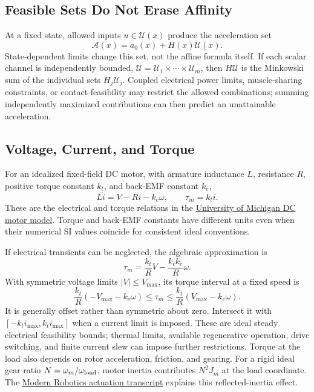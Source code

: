 \subsection{Feasible Sets Do Not Erase Affinity}

At a fixed state, allowed inputs $u\in\mathcal U(x)$ produce the acceleration set
\begin{equation}
\mathcal A(x)=a_0(x)+H(x)\mathcal U(x).
\end{equation}
State-dependent limits change this set, not the affine formula itself. If each scalar channel is independently bounded, $\mathcal U=\mathcal U_1\times\cdots\times\mathcal U_m$, then $H\mathcal U$ is the Minkowski sum of the individual sets $H_j\mathcal U_j$. Coupled electrical power limits, muscle-sharing constraints, or contact feasibility may restrict the allowed combinations; summing independently maximized contributions can then predict an unattainable acceleration.

\subsection{Voltage, Current, and Torque}

For an idealized fixed-field DC motor, with armature inductance $L$, resistance $R$, positive torque constant $k_t$, and back-EMF constant $k_e$,
\begin{equation}
L\dot i=V-Ri-k_e\omega,\qquad \tau_m=k_t i.
\end{equation}
These are the electrical and torque relations in the \href{https://ctms.engin.umich.edu/CTMS/?example=MotorSpeed&section=SystemModeling}{University of Michigan DC motor model}. Torque and back-EMF constants have different units even when their numerical SI values coincide for consistent ideal conventions.

If electrical transients can be neglected, the algebraic approximation is
\begin{equation}
\tau_m=\frac{k_t}{R}V-\frac{k_tk_e}{R}\omega.
\end{equation}
With symmetric voltage limits $|V|\le V_{\max}$, its torque interval at a fixed speed is
\begin{equation}
\frac{k_t}{R}(-V_{\max}-k_e\omega)
\le\tau_m\le
\frac{k_t}{R}(V_{\max}-k_e\omega).
\label{eq:ch3:motor-saturation}
\end{equation}
It is generally offset rather than symmetric about zero. Intersect it with $[-k_ti_{\max},k_ti_{\max}]$ when a current limit is imposed. These are ideal steady electrical feasibility bounds; thermal limits, available regenerative operation, drive switching, and finite current slew can impose further restrictions. Torque at the load also depends on rotor acceleration, friction, and gearing. For a rigid ideal gear ratio $N=\omega_m/\omega_{\rm load}$, motor inertia contributes $N^2J_m$ at the load coordinate. The \href{https://modernrobotics.northwestern.edu/nu-gm-book-resource/8-9-actuation-gearing-and-friction/}{Modern Robotics actuation transcript} explains this reflected-inertia effect.

